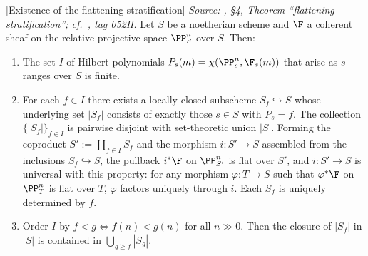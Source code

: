 \begin{theorem}

[Existence of the flattening stratification]
  \label{thm:flattening_stratification_exists}
  \textit{Source: \cite{nitsure-hilbert-quot}, \S4, Theorem ``flattening stratification'';
  cf.\ \cite{stacks-project}, tag 052H.}
  Let \(S\) be a noetherian scheme and \(\F\) a coherent sheaf on the relative
  projective space \(\PP^n_S\) over \(S\).  Then:
  \begin{enumerate}[label=(\roman*)]
    \item The set \(I\) of Hilbert polynomials
      \(P_s(m) = \chi(\PP^n_s, \F_s(m))\) that arise as \(s\) ranges over \(S\) is
      finite.
    \item For each \(f \in I\) there exists a locally-closed subscheme
      \(S_f \hookrightarrow S\) whose underlying set \(|S_f|\) consists of exactly
      those \(s \in S\) with \(P_s = f\).  The collection \(\{|S_f|\}_{f \in I}\) is
      pairwise disjoint with set-theoretic union \(|S|\).  Forming the coproduct
      \(S' := \coprod_{f \in I} S_f\) and the morphism \(i : S' \to S\) assembled
      from the inclusions \(S_f \hookrightarrow S\), the pullback \(i^* \F\) on
      \(\PP^n_{S'}\) is flat over \(S'\), and \(i : S' \to S\) is universal with this
      property: for any morphism \(\varphi : T \to S\) such that \(\varphi^* \F\) on
      \(\PP^n_T\) is flat over \(T\), \(\varphi\) factors uniquely through \(i\).
      Each \(S_f\) is uniquely determined by \(f\).
    \item Order \(I\) by \(f < g \iff f(n) < g(n)\) for all \(n \gg 0\). Then the
      closure of \(|S_f|\) in \(|S|\) is contained in \(\bigcup_{g \ge f} |S_g|\).
  \end{enumerate}
\end{theorem}

